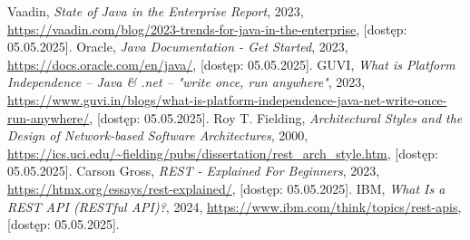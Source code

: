 \documentclass[a4paper,12pt,openany]{book}
\begin{document}
\begin{thebibliography}{99}
 Vaadin, \textit{State of Java in the Enterprise Report}, 2023, \url{https://vaadin.com/blog/2023-trends-for-java-in-the-enterprise}, [dostęp: 05.05.2025].
 Oracle, \textit{Java Documentation - Get Started}, 2023, \url{https://docs.oracle.com/en/java/}, [dostęp: 05.05.2025].
 GUVI, \textit{What is Platform Independence – Java \& .net – "write once, run anywhere"}, 2023, \url{https://www.guvi.in/blogs/what-is-platform-independence-java-net-write-once-run-anywhere/}, [dostęp: 05.05.2025].
 Roy T. Fielding, \textit{Architectural Styles and the Design of Network-based Software Architectures}, 2000, \url{https://ics.uci.edu/~fielding/pubs/dissertation/rest_arch_style.htm}, [dostęp: 05.05.2025].
 Carson Gross, \textit{REST - Explained For Beginners}, 2023, \url{https://htmx.org/essays/rest-explained/}, [dostęp: 05.05.2025].
 IBM, \textit{What Is a REST API (RESTful API)?}, 2024, \url{https://www.ibm.com/think/topics/rest-apis}, [dostęp: 05.05.2025].
\end{thebibliography}
\end{document}
